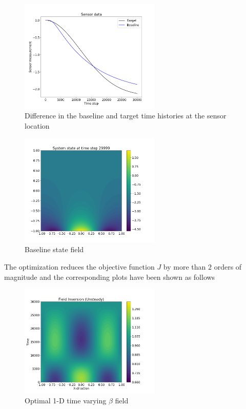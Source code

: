 \documentclass{article}
\begin{document}
\begin{figure}[H]
\centering
\includegraphics[width=0.6\textwidth]{init_comparison.png}
\caption{Difference in the baseline and target time histories at the sensor location}
\label{res}
\end{figure}

\begin{figure}[H]
\centering
\includegraphics[width=0.6\textwidth]{field.png}
\caption{Baseline state field}
\label{res}
\end{figure}

The optimization reduces the objective function $J$ by more than $2$ orders of magnitude and the corresponding plots have been shown as follows

\begin{figure}[H]
\centering
\includegraphics[width=0.6\textwidth]{beta_opt.png}
\caption{Optimal 1-D time varying $\beta$ field}
\label{res}
\end{figure}
\end{document}
